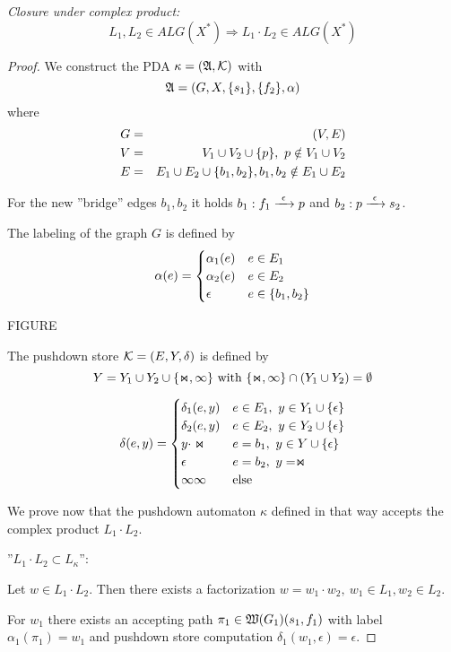 {\em Closure under complex product:}
\[ L_1, L_2 \in ALG(X^*) \Rightarrow L_1 \cdot L_2 \in ALG(X^*) \]
\begin{proof}
We construct the PDA $\kappa = (\mbox{$\mathfrak{A}$}, \mbox{$\mathcal{K}$})$ with 
\[\mbox{$\mathfrak{A}$} = (G, X, \mbox{$\{s_1\}$}, \mbox{$\{f_2\}$}, \alpha)\]
where
\begin{eqnarray*}
G &=& (V, E) \\
V &=& V_1 \cup V_2 \cup \mbox{$\{p\}$},\ p \notin V_1 \cup V_2 \\
E &=& E_1 \cup E_2 \cup \mbox{$\{b_1, b_2\}$},b_1, b_2 \notin E_1 \cup E_2
\end{eqnarray*}

For the new ''bridge'' edges $b_1, b_2$ it holds $b_1: f_1 \xrightarrow{\ {\epsilon}\ } p$
and $b_2: p \xrightarrow{\ {\epsilon}\ } s_2$.

The labeling of the graph $G$ is defined by 
\[ \alpha(e) = \begin{cases} 
\alpha_1(e) 	& e \in E_1 \\
\alpha_2(e) 	& e \in E_2 \\
\epsilon 			& e \in \mbox{$\{b_1, b_2\}$} 
\end{cases}\]

FIGURE

The pushdown store $\mbox{$\mathcal{K}$} = (E, Y, \delta)$ is defined by
\[ Y = Y_1 \cup Y_2 \cup \mbox{$\{\Join, \infty\}$} \text{ with }\mbox{$\{\Join, \infty\}$} \cap
(Y_1 \cup Y_2) = \emptyset \]

\[ \delta(e, y) = \begin{cases}
\delta_1(e, y) 					& e \in E_1,\ y \in Y_1 \cup \mbox{$\{\epsilon\}$} \\
\delta_2(e, y) 					& e \in E_2,\ y \in Y_2 \cup \mbox{$\{\epsilon\}$} \\
y \cdot \Join 					& e = b_1,\ y \in Y \cup \mbox{$\{\epsilon\}$} \\
\epsilon 								& e = b_2,\ y = \Join \\
\infty\infty 						& \text{else}
\end{cases}\]

We prove now that the pushdown automaton $\kappa$ defined in that way accepts
the complex product $L_1 \cdot L_2$.

''$L_1 \cdot L_2 \subset L_{\kappa}$'':

Let $w \in L_1 \cdot L_2$. Then there exists a factorization $w = w_1 \cdot
w_2,\ w_1 \in L_1, w_2 \in L_2$.

For $w_1$ there exists an accepting path $\pi_1 \in \mbox{$\mathfrak{W}(G_1)$}(s_1,
f_1)$ with label $\alpha_1(\pi_1) = w_1$ and pushdown store computation
$\delta_1(w_1, \epsilon) = \epsilon$.


\end{proof}
